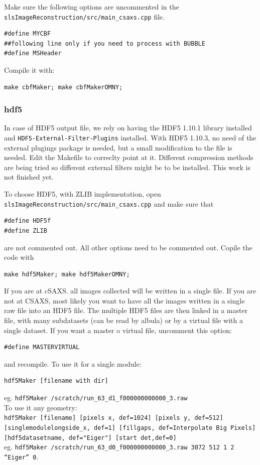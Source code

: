 \documentclass{article}
\begin{document}
{{{Make sure the following options are uncommented in the {\tt{slsImageReconstruction/src/main\_csaxs.cpp}} file. 
\begin{verbatim}
#define MYCBF
##following line only if you need to process with BUBBLE
#define MSHeader 
\end{verbatim}
Compile it with: 
\begin{verbatim}
make cbfMaker; make cbfMakerOMNY;
\end{verbatim}

\subsubsection{hdf5}
In case of HDF5 output file, we rely on having the HDF5 1.10.1 library installed and {\tt{HDF5-External-Filter-Plugins}} installed. With HDF5 1.10.3, no need of the external plugings package is needed, but a small modification to the file is needed. Edit the Makefile to correclty point at it. Different compression methods are being tried so different external filters might be to be installed. This work is not finished yet.

To choose HDF5, with ZLIB implementation, open {\tt{slsImageReconstruction/src/main\_csaxs.cpp}} and make sure that 
\begin{verbatim}
#define HDF5f
#define ZLIB
\end{verbatim}
are not commented out. All other options need to be commented out. Copile the code with 
\begin{verbatim}
make hdf5Maker; make hdf5MakerOMNY;
\end{verbatim}

If you are at cSAXS. all images collected will be written in a single file. If you are not at CSAXS, most likely you want to have all the images written in a single raw file into an HDF5 file. The multiple HDF5 files are then linked in a master file, with many subdatasets (can be read by albula) or by a virtual file with a single dataset. If you want a master o virtual file, uncomment this option:
\begin{verbatim}
#define MASTERVIRTUAL
\end{verbatim}
and recompile.
To use it for a single module:
\begin{verbatim}
hdf5Maker [filename with dir]
\end{verbatim}
eg.
{\tt{hdf5Maker /scratch/run\_63\_d1\_f000000000000\_3.raw}}\\

To use it any geometry:\\
{\tt{hdf5Maker [filename] [pixels x, def=1024] [pixels y, def=512] [singlemodulelongside\_x, def=1] [fillgaps, def=Interpolate Big Pixels] [hdf5datasetname, def="Eiger"] [start det,def=0]}}\\
eg.
{\tt hdf5Maker /scratch/run\_63\_d0\_f000000000000\_3.raw  3072 512 1 2 ``Eiger'' 0}.\\

}}}
\end{document}
